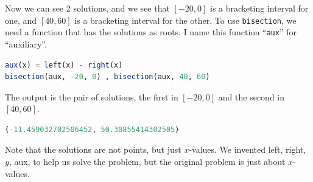 \documentclass[12pt,answers]{book}
\begin{document}
Now we can see 2 solutions, and we see that $[-20,0]$ is a bracketing interval for one, and $[40,60]$ is a bracketing interval for the other. To use {\tt bisection}, we need a function that has the solutions as roots. I name this function ``{\tt aux}'' for ``auxiliary''.
\begin{lstlisting}[language=Julia]
aux(x) = left(x) - right(x)
bisection(aux, -20, 0) , bisection(aux, 40, 60)
\end{lstlisting}
The output is the pair of solutions, the first in $[-20,0]$ and the second in $[40,60]$.
\begin{lstlisting}[language=Julia]
(-11.459032702506452, 50.30855414302505)
\end{lstlisting}
Note that the solutions are not points, but just $x$-values. We invented left, right, $y$, aux, to help us solve the problem, but the original problem is just about $x$-values.

\clearpage
\end{document}
